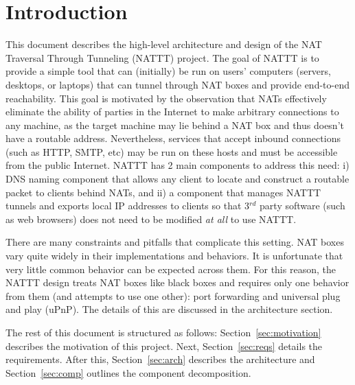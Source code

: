 \section{Introduction}

This document describes the high-level architecture and design of the NAT Traversal Through Tunneling (NATTT) project.  The goal of NATTT is
to provide a simple tool that can (initially) be run on users' computers (servers, desktops, or laptops) that can tunnel through NAT boxes
and provide end-to-end reachability.  This goal is motivated by the observation that NATs effectively eliminate the ability of parties in
the Internet to make arbitrary connections to any machine, as the target machine may lie behind a NAT box and thus doesn't have a routable
address.  Nevertheless, services that accept inbound connections (such as HTTP, SMTP, etc) may be run on these hosts and must be accessible
from the public Internet.  NATTT has 2 main components to address this need: i) DNS naming component that allows any client to locate and
construct a routable packet to clients behind NATs, and ii) a component that manages NATTT tunnels and exports local IP addresses to
clients so that 3$^{rd}$ party software (such as web browsers) does not need to be modified \emph{at all} to use NATTT.

There are many constraints and pitfalls that complicate this setting.  NAT boxes vary quite widely in their implementations and behaviors.
It is unfortunate that very little common behavior can be expected across them.  For this reason, the NATTT design treats NAT boxes like
black boxes and requires only one behavior from them (and attempts to use one other): port forwarding and universal plug and play (uPnP).
The details of this are discussed in the architecture section.

The rest of this document is structured as follows: Section~\ref{sec:motivation} describes the motivation of this project.  Next,
Section~\ref{sec:reqs} details the requirements.  After this, Section~\ref{sec:arch} describes the architecture and Section~\ref{sec:comp}
outlines the component decomposition.

